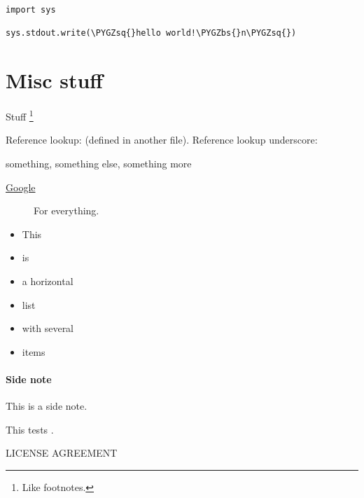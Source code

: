 \documentclass[letterpaper,10pt,english]{sphinxmanual}
\def\PYGZbs{\char`\\}
\def\PYGZsq{\char`\'}
\renewcommand\PYGZsq{\textquotesingle}
\begin{document}
\begin{Verbatim}[commandchars=\\\{\}]
import sys

sys.stdout.write(\PYGZsq{}hello world!\PYGZbs{}n\PYGZsq{})
\end{Verbatim}


\section{Misc stuff}
\label{markup:misc-stuff}
Stuff \footnote[1]{\sphinxAtStartFootnote%
Like footnotes.
}

Reference lookup: \label{markup:id3}{\hyperref[markup:ref1]{\crossref{{[}Ref1{]}}}} (defined in another file).
Reference lookup underscore: \label{markup:id4}{\hyperref[markup:ref\string-1]{\crossref{{[}Ref\_1{]}}}}




something, something else, something more
\begin{description}
\item[{\href{http://www.google.com}{Google}}] \leavevmode
For everything.

\end{description}


\begin{itemize}\setlength{\itemsep}{0pt}\setlength{\parskip}{0pt}
\item {} 
This

\item {} 
is

\item {} 
a horizontal

\item {} 
list

\item {} 
with several

\item {} 
items

\end{itemize}
\paragraph{Side note}

This is a side note.

This tests .

\begin{center}LICENSE AGREEMENT
\end{center}
\end{document}
